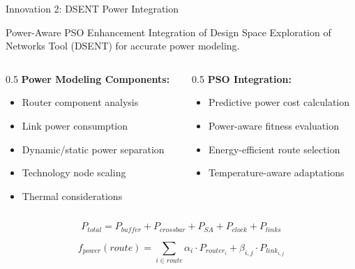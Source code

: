 \documentclass[10pt]{beamer}
\begin{document}
\begin{frame}{Innovation 2: DSENT Power Integration}
    \begin{block}{Power-Aware PSO Enhancement}
        Integration of Design Space Exploration of Networks Tool (DSENT) for accurate power modeling.
    \end{block}
    
    \begin{columns}
        \begin{column}{0.5\textwidth}
            \textbf{Power Modeling Components:}
            \begin{itemize}
                \item Router component analysis
                \item Link power consumption
                \item Dynamic/static power separation
                \item Technology node scaling
                \item Thermal considerations
            \end{itemize}
        \end{column}
        \begin{column}{0.5\textwidth}
            \textbf{PSO Integration:}
            \begin{itemize}
                \item Predictive power cost calculation
                \item Power-aware fitness evaluation
                \item Energy-efficient route selection
                \item Temperature-aware adaptations
            \end{itemize}
        \end{column}
    \end{columns}
    
    \begin{equation}
        P_{total} = P_{buffer} + P_{crossbar} + P_{SA} + P_{clock} + P_{links}
    \end{equation}
    
    \begin{equation}
        f_{power}(route) = \sum_{i \in route} \alpha_i \cdot P_{router_i} + \beta_{i,j} \cdot P_{link_{i,j}}
    \end{equation}
\end{frame}
\end{document}
